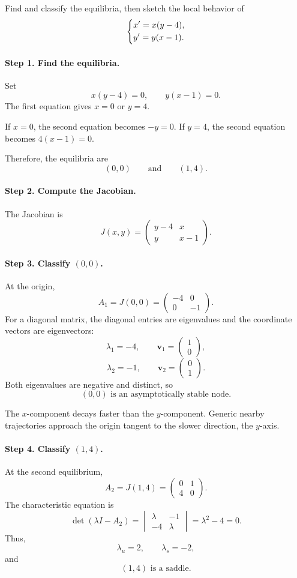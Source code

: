 \documentclass[10pt,letterpaper]{article}
\begin{document}
\begin{example}[2]{
Find and classify the equilibria, then sketch the
local behavior of
\[
\begin{dcases}
x'=x(y-4),\\
y'=y(x-1).
\end{dcases}
\]
}

\paragraph{Step 1. Find the equilibria.}
Set
\[
x(y-4)=0,\qquad y(x-1)=0.
\]
The first equation gives $x=0$ or $y=4$.

If $x=0$, the second equation becomes $-y=0$.
If $y=4$, the second equation becomes $4(x-1)=0$.

Therefore, the equilibria are
\[
\boxed{(0,0)\qquad\text{and}\qquad(1,4).}
\]

\paragraph{Step 2. Compute the Jacobian.}
The Jacobian is
\[
\boxed{
J(x,y)=
\begin{pmatrix}
y-4&x\\
y&x-1
\end{pmatrix}.
}
\]

\paragraph{Step 3. Classify $(0,0)$.}
At the origin,
\[
A_1=J(0,0)=
\begin{pmatrix}
-4&0\\
0&-1
\end{pmatrix}.
\]
For a diagonal matrix, the diagonal entries are
eigenvalues and the coordinate vectors are eigenvectors:
\[
\lambda_1=-4,\qquad
\mathbf{v}_1=\begin{pmatrix}1\\0\end{pmatrix},
\]
\[
\lambda_2=-1,\qquad
\mathbf{v}_2=\begin{pmatrix}0\\1\end{pmatrix}.
\]
Both eigenvalues are negative and distinct, so
\[
\boxed{(0,0)\text{ is an asymptotically stable node}.}
\]

The $x$-component decays faster than the $y$-component.
Generic nearby trajectories approach the origin
tangent to the slower direction, the $y$-axis.

\paragraph{Step 4. Classify $(1,4)$.}
At the second equilibrium,
\[
A_2=J(1,4)=
\begin{pmatrix}
0&1\\
4&0
\end{pmatrix}.
\]
The characteristic equation is
\[
\det(\lambda I-A_2)
=
\begin{vmatrix}
\lambda&-1\\
-4&\lambda
\end{vmatrix}
=\lambda^2-4=0.
\]
Thus,
\[
\lambda_u=2,\qquad \lambda_s=-2,
\]
and
\[
\boxed{(1,4)\text{ is a saddle}.}
\]


\end{example}
\end{document}
